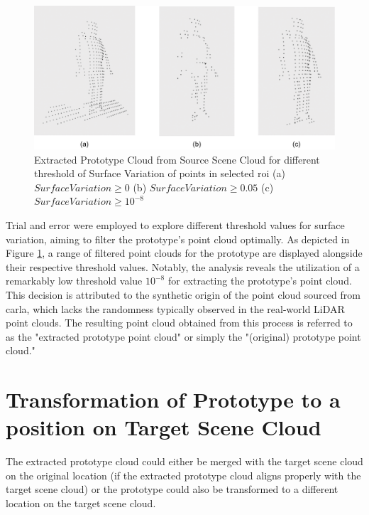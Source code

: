 \begin{figure}[htbp]
    \centering
    \includegraphics[width=0.8\linewidth]{97_graphics/results/prototype_extracted.pdf}
    \caption[Extracted Prototype Cloud from Source Scene Cloud]{Extracted Prototype Cloud from Source Scene Cloud for different threshold of Surface Variation of points in selected \acrshort{roi} (a) \(Surface Variation \geq 0 \)  (b) \(Surface Variation \geq 0.05 \)  (c) \(Surface Variation \geq 10^{-8} \)}
    \label{fig:result-prototype_extracted}
\end{figure}

Trial and error were employed to explore different threshold values for surface variation, aiming to filter the prototype's point cloud optimally. As depicted in Figure \ref{fig:result-prototype_extracted}, a range of filtered point clouds for the prototype are displayed alongside their respective threshold values. Notably, the analysis reveals the utilization of a remarkably low threshold value \(10^{-8}\) for extracting the prototype's point cloud. This decision is attributed to the synthetic origin of the point cloud sourced from \acrshort{carla}, which lacks the randomness typically observed in the real-world LiDAR point clouds. The resulting point cloud obtained from this process is referred to as the "extracted prototype point cloud" or simply the "(original) prototype point cloud."

\section{Transformation of Prototype to a position on Target Scene Cloud}
The extracted prototype cloud could either be merged with the target scene cloud on the original location (if the extracted prototype cloud aligns properly with the target scene cloud) or the prototype could also be transformed to a different location on the target scene cloud.

